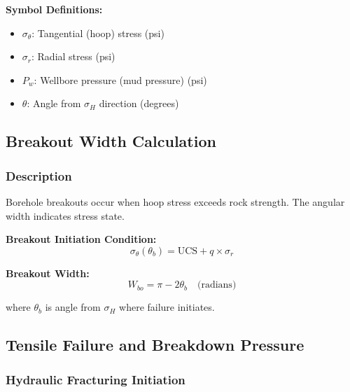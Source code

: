 \documentclass[11pt,a4paper]{article}
\newcommand{\symitem}[2]{\item \textbf{#1}: #2}
\begin{document}
\textbf{Symbol Definitions:}
\begin{itemize}[leftmargin=2cm]
\symitem{$\sigma_\theta$}{Tangential (hoop) stress (psi)}
\symitem{$\sigma_r$}{Radial stress (psi)}
\symitem{$P_w$}{Wellbore pressure (mud pressure) (psi)}
\symitem{$\theta$}{Angle from $\sigma_H$ direction (degrees)}
\end{itemize}

\subsection{Breakout Width Calculation}

\subsubsection{Description}
Borehole breakouts occur when hoop stress exceeds rock strength. The angular width indicates stress state.

\begin{tcolorbox}[colback=formulabox,colframe=black!75]
\textbf{Breakout Initiation Condition:}
\begin{equation}
\sigma_\theta(\theta_b) = \text{UCS} + q \times \sigma_r
\end{equation}

\textbf{Breakout Width:}
\begin{equation}
W_{bo} = \pi - 2\theta_b \quad \text{(radians)}
\end{equation}

where $\theta_b$ is angle from $\sigma_H$ where failure initiates.
\end{tcolorbox}

\subsection{Tensile Failure and Breakdown Pressure}

\subsubsection{Hydraulic Fracturing Initiation}
\end{document}
